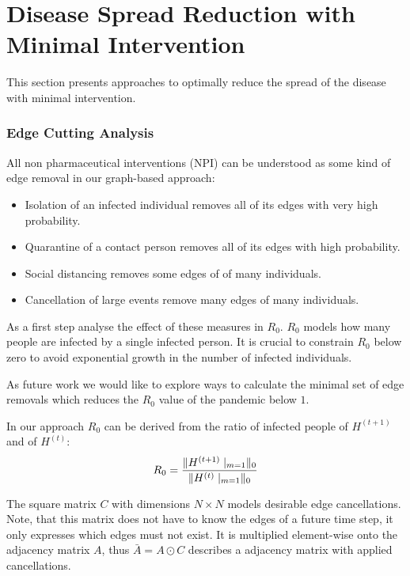 
\section{Disease Spread Reduction with Minimal Intervention}
This section presents approaches to optimally reduce the spread of the disease with minimal intervention.

\subsubsection{Edge Cutting Analysis}
All non pharmaceutical interventions (NPI) can be understood as some kind of edge removal in our graph-based approach:
\begin{itemize}
	\item Isolation of an infected individual removes all of its edges with very high probability.
	\item Quarantine of a contact person removes all of its edges with high probability.
	\item Social distancing removes some edges of of many individuals.
	\item Cancellation of large events remove many edges of many individuals.
\end{itemize}
As a first step analyse the effect of these measures in $R_0$.
$R_0$ models how many people are infected by a single infected person.
It is crucial to constrain $R_0$ below zero to avoid exponential growth in the number of infected individuals.


As future work we would like to explore ways to calculate the minimal set of edge removals which reduces the $R_0$ value of the pandemic below $1$.

In our approach $R_0$ can be derived from the ratio of infected people of $H^{(t+1)}$ and of $H^{(t)}$:
\begin{equation}
	R_0 = \frac{\norm{H^{(t+1)}\mid_{m=1}}_{0}}{\norm{H^{(t)}\mid_{m=1}}_{0}} %
\end{equation}

The square matrix $C$ with dimensions $N \times N$ models desirable edge cancellations.
Note, that this matrix does not have to know the edges of a future time step, it only expresses which edges must not exist.
It is multiplied element-wise onto the adjacency matrix $A$, thus $\bar{A} = A \odot C$ describes a adjacency matrix with applied cancellations.

